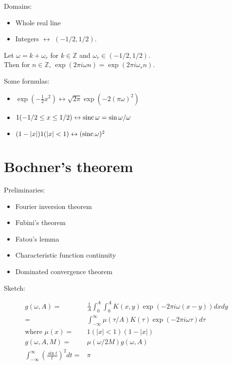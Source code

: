 \documentclass[twoside,11pt]{article}
\numberwithin{equation}{section}
\begin{document}
Domains:
%
\begin{itemize}
    \item Whole real line
    \item Integers $\leftrightarrow$ $(-1/2, 1/2)$.
\end{itemize}
%
Let $\omega = k + \omega_r$ for $k \in \mathbb{Z}$ and $\omega_r \in (-1/2, 1/2)$.\\
Then for $n \in \mathbb{Z}$, $\exp(2\pi i \omega n) = \exp(2\pi i \omega_r n)$.

Some formulas:
%
\begin{itemize}
    \item $\exp\left(-\frac{1}{2} x^2 \right) \leftrightarrow \sqrt{2\pi} \exp\left(-2 (\pi \omega)^2 \right)$
    \item $1(-1/2 \le x \le 1/2) \leftrightarrow \mathrm{sinc}\, \omega = \sin \omega / \omega$
    \item $(1 - |x|) 1(|x| < 1) \leftrightarrow (\mathrm{sinc}\, \omega)^2$
\end{itemize}
%

%



\newpage
\section*{Bochner's theorem}

Preliminaries:
%
\begin{itemize}
    \item Fourier inversion theorem
    \item Fubini's theorem
    \item Fatou's lemma
    \item Characteristic function continuity
    \item Dominated convergence theorem
\end{itemize}
%
Sketch:

%
\begin{align*}
    g(\omega, A) ={}& \frac{1}{A} \int_0^A \int_0^A K(x, y) \exp(-2 \pi i \omega (x - y)) dx dy \\
        ={}& \int_{-\infty}^\infty \mu(\tau / A) K(\tau) \exp(-2 \pi i \omega \tau) d\tau \\
\textrm{where }    \mu(x) ={}& 1(|x| < 1)(1 - |x|) \\
    g(\omega, A, M) ={}& \mu(\omega / 2M) g(\omega, A) \\
    \int_{-\infty}^\infty \left(\frac{\sin t}{t}\right)^2 dt ={}& \pi
\end{align*}
%
\end{document}
